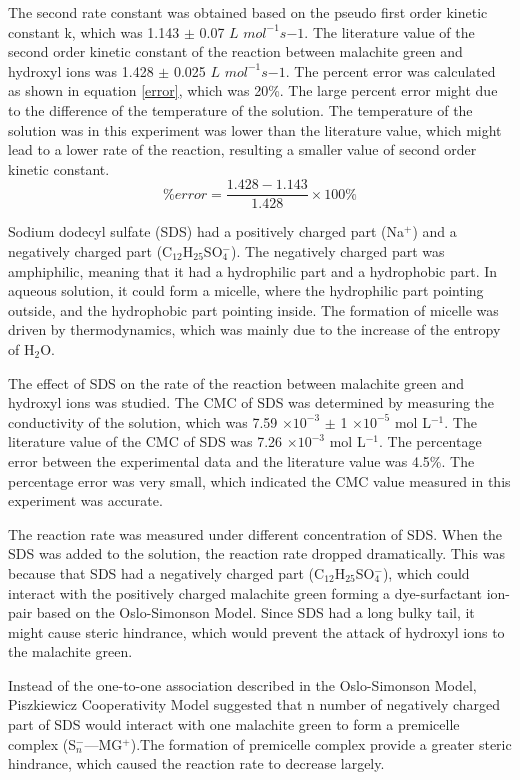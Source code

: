 \documentclass[twocolumn]{article} %
\begin{document}
The second rate constant was obtained based on the pseudo first order kinetic constant k, which was 1.143 $\pm$ 0.07 $L$ $mol^{-1}s{-1}$. The literature value of the second order kinetic constant of the reaction between malachite green and hydroxyl ions was 1.428 $\pm$ 0.025 $L$ $mol^{-1}s{-1}$.\cite{intro} The percent error was calculated as shown in equation \ref{error}, which was 20\%. The large percent error might due to the difference of the temperature of the solution. The temperature of the solution was in this experiment was lower than the literature value, which might lead to a lower rate of the reaction, resulting a smaller value of second order kinetic constant.
\begin{equation}
    \label{error}
    \% error = \frac{1.428-1.143}{1.428} \times 100\%
\end{equation}

Sodium dodecyl sulfate (SDS) had a positively charged part (Na$^+$) and a negatively charged part (C$_12$H$_25$SO$_4^-$). The negatively charged part was amphiphilic, meaning that it had a hydrophilic part and a hydrophobic part. In aqueous solution, it could form a micelle, where the hydrophilic part pointing outside, and the hydrophobic part pointing inside. The formation of micelle was driven by thermodynamics, which was mainly due to the increase of the entropy of H$_2$O.

The effect of SDS on the rate of the reaction between malachite green and hydroxyl ions was studied. The CMC of SDS was determined by measuring the conductivity of the solution, which was 7.59 $\times 10^{-3}$ $\pm$ 1 $\times 10^{-5}$ mol L$^{-1}$. The literature value of the CMC of SDS was 7.26 $\times 10^{-3}$ mol L$^{-1}$.\cite{intro} The percentage error between the experimental data and the literature value was 4.5\%. The percentage error was very small, which indicated the CMC value measured in this experiment was accurate. 

The reaction rate was measured under different concentration of SDS. When the SDS was added to the solution, the reaction rate dropped dramatically. This was because that SDS had a negatively charged part (C$_{12}$H$_25$SO$_4^-$), which could interact with the positively charged malachite green forming a dye-surfactant ion-pair based on the Oslo-Simonson Model.\cite{21} Since SDS had a long bulky tail, it might cause steric hindrance, which would prevent the attack of hydroxyl ions to the malachite green.

Instead of the one-to-one association described in the Oslo-Simonson Model, Piszkiewicz Cooperativity Model suggested that n number of negatively charged part of SDS would interact with one malachite green to form a premicelle complex (S$^-_n$---MG$^+$).\cite{22}The formation of premicelle complex provide a greater steric hindrance, which caused the reaction rate to decrease largely. 
\end{document}
